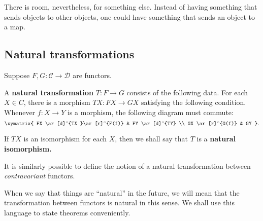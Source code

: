 There is room, nevertheless, for something else. Instead of having
something that sends objects to other objects, one could have something that
sends an object to a map.



\subsection{Natural transformations}



Suppose $F, G: \mathcal{C} \to \mathcal{D}$ are functors.

\begin{definition}
A \textbf{natural transformation} $T: F \to G$ consists of the following data.
For each $X \in C$, there is a morphism $TX: FX \to GX$ satisfying the
following
condition. Whenever $f: X \to Y$ is a morphism, the following diagram must
commute:
\[ \xymatrix{
FX \ar[d]^{TX }\ar[r]^{F(f)} &  FY \ar[d]^{TY}  \\
GX \ar[r]^{G(f)} &  GY
}.\]

If $TX$ is an isomorphism for each $X$, then we shall say that $T$ is a
\textbf{natural isomorphism.}
\end{definition}

It is similarly possible to define the notion of a natural transformation
between \emph{contravariant} functors. 

When we say that things are ``natural'' in the future, we will mean that the
transformation between functors is natural in this sense.
We shall use this language to state theorems conveniently.

